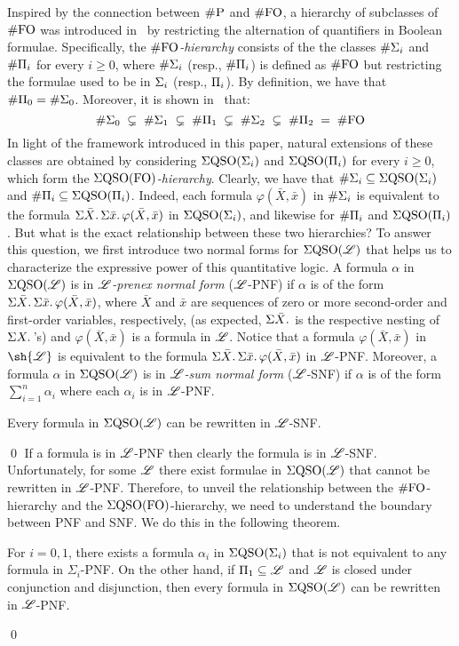 
Inspired by the connection between $\text{\sc \#P}$ and $\#{\rm FO}$, a hierarchy of subclasses of $\#{\rm FO}$ was introduced in~\cite{SalujaST95} 
by restricting the alternation of quantifiers in Boolean formulae.
Specifically, the \emph{$\#{\rm FO}$-hierarchy} consists of the 
the classes $\#\Sigma_{i}$ and $\#\Pi_{i}$ for every $i \geq 0$, where $\#\Sigma_{i}$ (resp., $\#\Pi_{i}$) is defined as $\#{\rm FO}$ but restricting the formulae used to be in $\Sigma_{i}$ (resp., $\Pi_{i}$).
By definition, we have that $\#\Pi_{0} = \#\Sigma_{0}$. Moreover, it is shown in~\cite{SalujaST95} that:
\[
\#\Sigma_{0} \; \subsetneq \; \#\Sigma_{1} \; \subsetneq \; \#\Pi_{1} \; \subsetneq \; \#\Sigma_{2} \; \subsetneq \; \#\Pi_{2} \; = \; \#{\rm FO} 
\]
In light of the framework introduced in this paper, natural extensions of these classes are obtained by considering 
$\Sigma{\rm QSO}(\Sigma_{i})$ and $\Sigma{\rm QSO}(\Pi_{i})$ for every $i \geq 0$, which form the \emph{$\Sigma{\rm QSO}({\rm FO})$-hierarchy}.
Clearly, we have that $\#\Sigma_{i} \subseteq \Sigma{\rm QSO}(\Sigma_{i})$ and $\#\Pi_{i} \subseteq \Sigma{\rm QSO}(\Pi_{i})$. Indeed, each formula $\varphi(\bar{X}, \bar{x})$ in $\#\Sigma_{i}$ is equivalent to the formula $\Sigma{\bar X}.\, \Sigma{\bar x}.\, \varphi(\bar{X}, \bar{x})$ in $\Sigma{\rm QSO}(\Sigma_{i})$, and likewise for $\#\Pi_{i}$ and $\Sigma{\rm QSO}(\Pi_{i})$.
But what is the exact relationship between these two hierarchies?
To answer this question, we first introduce two normal forms for $\Sigma{\rm QSO}(\mathscr{L})$ that helps us to characterize the expressive power of this quantitative logic.
A formula $\alpha$ in $\Sigma{\rm QSO}(\mathscr{L})$ is in \emph{$\mathscr{L}$-prenex normal form} ($\mathscr{L}$-PNF) 
if $\alpha$ is of the form
$\Sigma{\bar{X}}.\, \Sigma{\bar{x}}.\, \varphi(\bar{X}, \bar{x})$,
where $\bar{X}$ and $\bar{x}$ are sequences of zero or more second-order and first-order variables, respectively, (as expected, $\Sigma{\bar{X}}.\,\!$ is the respective nesting of $\Sigma{X}.\,$'s) and $\varphi(\bar{X}, \bar{x})$ is a formula in $\mathscr{L}$. Notice that 
a formula $\varphi(\bar{X}, \bar{x})$ in $\sh{\LL}$ is equivalent to the formula $\Sigma{\bar X}.\, \Sigma{\bar x}.\, \varphi(\bar{X}, \bar{x})$ in $\mathscr{L}$-PNF. 
Moreover, a formula $\alpha$ in $\Sigma{\rm QSO}(\mathscr{L})$ is in \emph{$\mathscr{L}$-sum normal form} ($\mathscr{L}$-SNF) if $\alpha$ is of the form $\sum_{i=1}^n \alpha_i$ where each $\alpha_i$ is in $\mathscr{L}$-PNF. 
\begin{prop}\label{theo-pnf-snf}
Every formula in $\Sigma{\rm QSO}(\mathscr{L})$ can be rewritten in $\mathscr{L}$-SNF.
\end{prop}
\proof

\qed
If a formula is in $\mathscr{L}$-PNF then clearly the formula is in $\mathscr{L}$-SNF.
Unfortunately, for some $\mathscr{L}$ there exist formulae in $\Sigma{\rm QSO}(\mathscr{L})$  that cannot be rewritten in $\mathscr{L}$-PNF.
Therefore, to unveil the relationship between the $\#{\rm FO}$-hierarchy and the $\Sigma{\rm QSO}({\rm FO})$-hierarchy, we need to understand the boundary between PNF and SNF. We do this in the following theorem. 
\begin{thm}\label{theo-pi1-pnf}
For $i = 0,1$, there exists a formula $\alpha_i$ in $\Sigma{\rm QSO}(\Sigma_{i})$ that is not equivalent to any formula in $\Sigma_i$-PNF. 
On the other hand, if $\Pi_{1} \subseteq \mathscr{L}$ and $\mathscr{L}$ is closed under conjunction and disjunction, then every formula in $\Sigma{\rm QSO}(\mathscr{L})$ can be rewritten in $\mathscr{L}$-PNF. 
\end{thm}
\proof

\qed

